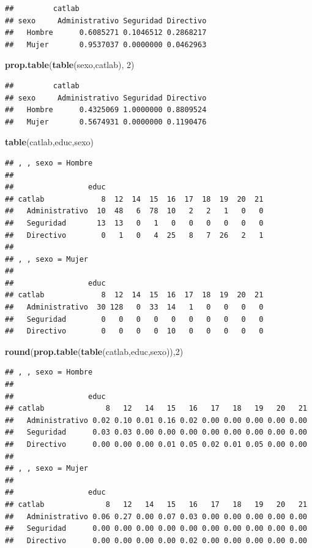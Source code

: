 \documentclass[]{book}
\newenvironment{Shaded}{\begin{snugshade}}{\end{snugshade}}
\newcommand{\DecValTok}[1]{\textcolor[rgb]{0.00,0.00,0.81}{#1}}
\newcommand{\KeywordTok}[1]{\textcolor[rgb]{0.13,0.29,0.53}{\textbf{#1}}}
\newcommand{\NormalTok}[1]{#1}
\begin{document}
\begin{verbatim}
##         catlab
## sexo     Administrativo Seguridad Directivo
##   Hombre      0.6085271 0.1046512 0.2868217
##   Mujer       0.9537037 0.0000000 0.0462963
\end{verbatim}

\begin{Shaded}
\begin{Highlighting}[]
\KeywordTok{prop.table}\NormalTok{(}\KeywordTok{table}\NormalTok{(sexo,catlab), }\DecValTok{2}\NormalTok{)}
\end{Highlighting}
\end{Shaded}

\begin{verbatim}
##         catlab
## sexo     Administrativo Seguridad Directivo
##   Hombre      0.4325069 1.0000000 0.8809524
##   Mujer       0.5674931 0.0000000 0.1190476
\end{verbatim}

\begin{Shaded}
\begin{Highlighting}[]
\KeywordTok{table}\NormalTok{(catlab,educ,sexo)}
\end{Highlighting}
\end{Shaded}

\begin{verbatim}
## , , sexo = Hombre
## 
##                 educ
## catlab             8  12  14  15  16  17  18  19  20  21
##   Administrativo  10  48   6  78  10   2   2   1   0   0
##   Seguridad       13  13   0   1   0   0   0   0   0   0
##   Directivo        0   1   0   4  25   8   7  26   2   1
## 
## , , sexo = Mujer
## 
##                 educ
## catlab             8  12  14  15  16  17  18  19  20  21
##   Administrativo  30 128   0  33  14   1   0   0   0   0
##   Seguridad        0   0   0   0   0   0   0   0   0   0
##   Directivo        0   0   0   0  10   0   0   0   0   0
\end{verbatim}

\begin{Shaded}
\begin{Highlighting}[]
\KeywordTok{round}\NormalTok{(}\KeywordTok{prop.table}\NormalTok{(}\KeywordTok{table}\NormalTok{(catlab,educ,sexo)),}\DecValTok{2}\NormalTok{)}
\end{Highlighting}
\end{Shaded}

\begin{verbatim}
## , , sexo = Hombre
## 
##                 educ
## catlab              8   12   14   15   16   17   18   19   20   21
##   Administrativo 0.02 0.10 0.01 0.16 0.02 0.00 0.00 0.00 0.00 0.00
##   Seguridad      0.03 0.03 0.00 0.00 0.00 0.00 0.00 0.00 0.00 0.00
##   Directivo      0.00 0.00 0.00 0.01 0.05 0.02 0.01 0.05 0.00 0.00
## 
## , , sexo = Mujer
## 
##                 educ
## catlab              8   12   14   15   16   17   18   19   20   21
##   Administrativo 0.06 0.27 0.00 0.07 0.03 0.00 0.00 0.00 0.00 0.00
##   Seguridad      0.00 0.00 0.00 0.00 0.00 0.00 0.00 0.00 0.00 0.00
##   Directivo      0.00 0.00 0.00 0.00 0.02 0.00 0.00 0.00 0.00 0.00
\end{verbatim}
\end{document}
